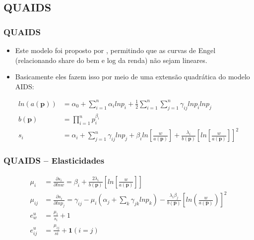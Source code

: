 \documentclass{beamer}
\begin{document}
\subsection{QUAIDS}
\begin{frame}[fragile]\frametitle{QUAIDS}
\begin{itemize}
  \item Este modelo foi proposto por \citet{Banks2007}, permitindo que as curvas de Engel (relacionando share do bem e log da renda) não sejam lineares.
  \item Basicamente eles fazem isso por meio de uma extensão quadrática do modelo AIDS:
\end{itemize}
\begin{eqnarray*}
ln(a(\mathbf{p})) &= \alpha_{0}+\sum_{i=1}^{n} \alpha_{i} lnp_{i}+\frac{1}{2}\sum_{i=1}^{n} \sum_{j=1}^{n} \gamma_{ij} lnp_{i} lnp_{j}\\
b(\mathbf{p})&=\prod_{i=1}^{n}p_{i}^{\beta_{i}}\\
s_{i}&=\alpha_{i}+\sum_{j=1}^{n}\gamma_{ij}lnp_{j}+\beta_{i}ln \left[ \frac{w}{a(\mathbf{p})}\right]+\frac{\lambda_{i}}{b(\mathbf{p})}\left[ ln \left[\frac{w}{a(\mathbf{p})}  \right] \right] ^{2}
\end{eqnarray*}
\end{frame}

\begin{frame}[fragile]\frametitle{QUAIDS -- Elasticidades}
\begin{align*}    
\mu_{i}&=\frac{\partial s_{i}}{\partial ln w}=\beta_{i}+\frac{2\lambda_{i}}{b(\mathbf{p})} \left[ln \left[ \frac{w}{a(\mathbf{p})}  \right]   \right]\\
\mu_{ij}&=\frac{\partial s_{i}}{\partial ln p_{j}}=\gamma_{ij}-\mu_{i}\left(\alpha_{j} +\sum_{k} \gamma_{jk} lnp_{k}  \right) - \frac{\lambda_{i} \beta_{j}}{b(\mathbf{p})} \left[ ln \left( \frac{w}{a(\mathbf{p})} \right) \right]^{2}\\
e_{w}^{u}&=\frac{\mu_{i}}{s_{i}}+1\\
e_{ij}^{u}&=\frac{\mu_{ij}}{s{i}}+\mathbf{1}(i=j)
\end{align*}
\end{frame}
\end{document}
